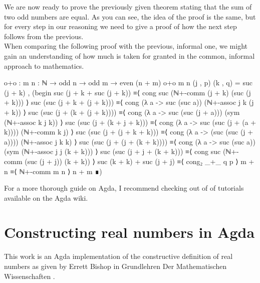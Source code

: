 \documentclass[11pt,a4paper]{article}
\begin{document}
We are now ready to prove the previously given theorem stating that the sum of two odd numbers are equal. As you can see, the idea of the proof is the same, but for every step in our reasoning we need to give a proof of how the next step follows from the previous.\\
When comparing the following proof with the previous, informal one, we might gain an understanding of how much is taken for granted in the common, informal approach to mathematics. 
\begin{code}
o+o : {m n : ℕ} → odd n → odd m → even (n + m)
o+o {m} {n} (j , p) (k , q) = suc (j + k) , 
  (begin 
    suc (j + k + suc (j + k)) ≡⟨ cong suc (ℕ+-comm (j + k) (suc (j + k)))  ⟩ 
    suc (suc (j + k + (j + k))) ≡⟨ cong (λ a -> suc (suc a)) (ℕ+-assoc j k (j + k))  ⟩ 
    suc (suc (j + (k + (j + k)))) ≡⟨ cong (λ a -> suc (suc (j + a))) (sym (ℕ+-assoc k j k))  ⟩ 
    suc (suc (j + (k + j + k))) ≡⟨ cong (λ a -> suc (suc (j + (a + k)))) (ℕ+-comm k j)  ⟩
    suc (suc (j + (j + k + k))) ≡⟨ cong (λ a -> (suc (suc (j + a)))) (ℕ+-assoc j k k)  ⟩ 
    suc (suc (j + (j + (k + k)))) ≡⟨ cong (λ a -> suc (suc a)) (sym (ℕ+-assoc j j (k + k)))  ⟩ 
    suc (suc (j + j + (k + k))) ≡⟨ cong suc (ℕ+-comm (suc (j + j)) (k + k)) ⟩ 
    suc (k + k) + suc (j + j) ≡⟨ cong₂ _+_  q p  ⟩ 
    m + n ≡⟨ ℕ+-comm m n  ⟩ 
    n + m
  ∎)
\end{code}
For a more thorough guide on Agda, I recommend checking out of of tutorials available on the Agda wiki. \cite{agdatutorial}\\


\section{Constructing real numbers in Agda}\label{sec: reals in agda}
This work is an Agda implementation of the constructive definition of real numbers as given by Errett Bishop in Grundlehren Der Mathematischen Wissenschaften \cite{bishop:67}. 
\end{document}
